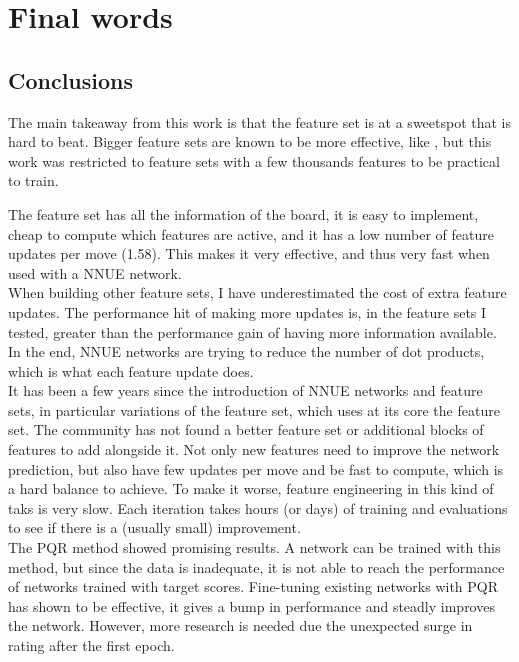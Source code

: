 \section{Final words}
\subsection{Conclusions}


The main takeaway from this work is that the  feature set is at a sweetspot that is hard to beat. Bigger feature sets are known to be more effective, like , but this work was restricted to feature sets with a few thousands features to be practical to train.

The feature set  has all the information of the board, it is easy to implement, cheap to compute which features are active, and it has a low number of feature updates per move (1.58). This makes it very effective, and thus very fast when used with a NNUE network. \\

When building other feature sets, I have underestimated the cost of extra feature updates. The performance hit of making more updates is, in the feature sets I tested, greater than the performance gain of having more information available. In the end, NNUE networks are trying to reduce the number of dot products, which is what each feature update does. \\

It has been a few years since the introduction of NNUE networks and feature sets, in particular variations of the  feature set, which uses at its core the  feature set. 
The community has not found a better feature set or additional blocks of features to add alongside it. Not only new features need to improve the network prediction, but also have few updates per move and be fast to compute, which is a hard balance to achieve.
To make it worse, feature engineering in this kind of taks is very slow. Each iteration takes hours (or days) of training and evaluations to see if there is a (usually small) improvement. \\

The PQR method showed promising results. A network can be trained with this method, but since the data is inadequate, it is not able to reach the performance of networks trained with target scores.
Fine-tuning existing networks with PQR has shown to be effective, it gives a bump in performance and steadly improves the network. However, more research is needed due the unexpected surge in rating after the first epoch.

